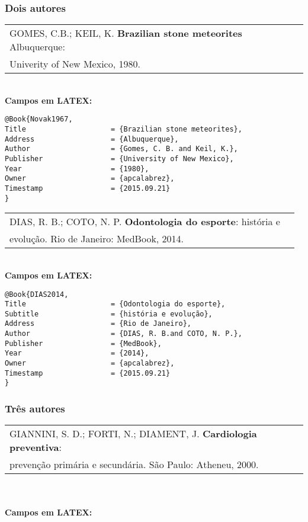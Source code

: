 \subsubsection{Dois autores}

\begin{tabular}{|l|c|} \hline
GOMES, C.B.; KEIL, K. \textbf{Brazilian stone meteorites} Albuquerque: \\ Univerity of New Mexico, 1980. \\\hline
\end{tabular}\\

\textbf{Campos em LATEX:}
\begin{verbatim}
@Book{Novak1967,
Title                    = {Brazilian stone meteorites},
Address                  = {Albuquerque},
Author                   = {Gomes, C. B. and Keil, K.},
Publisher                = {University of New Mexico},
Year                     = {1980},
Owner                    = {apcalabrez},
Timestamp                = {2015.09.21}
}
\end{verbatim}

\begin{tabular}{|l|c|} \hline
DIAS, R. B.; COTO, N. P. \textbf{Odontologia do esporte}: história e \\ evolução. Rio de Janeiro: MedBook, 2014. \\\hline
\end{tabular}\\

\textbf{Campos em LATEX:}

\begin{verbatim}
@Book{DIAS2014,
Title                    = {Odontologia do esporte},
Subtitle                 = {história e evolução},
Address                  = {Rio de Janeiro},
Author                   = {DIAS, R. B.and COTO, N. P.},
Publisher                = {MedBook},
Year                     = {2014},
Owner                    = {apcalabrez},
Timestamp                = {2015.09.21}
}
\end{verbatim}

\subsubsection{Tr\^es autores}

\begin{tabular}{|l|c|} \hline
GIANNINI, S. D.; FORTI, N.; DIAMENT, J. \textbf{Cardiologia preventiva}:\\ prevenção prim\'aria e secund\'aria. São Paulo: Atheneu, 2000. \\\hline
\end{tabular}\\
\\
\textbf{Campos em LATEX:}

